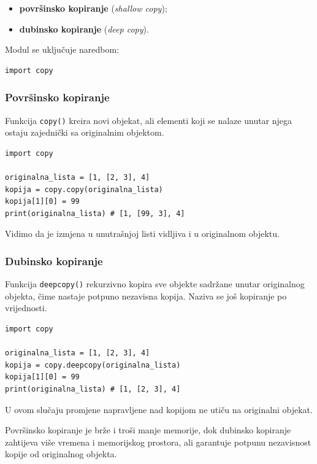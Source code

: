 \begin{itemize}
	\item \textbf{površinsko kopiranje} (\emph{shallow copy});
	\item \textbf{dubinsko kopiranje} (\emph{deep copy}).
\end{itemize}

Modul se uključuje naredbom:

\begin{verbatim}
import copy
\end{verbatim}

\subsubsection{Površinsko kopiranje}

Funkcija \texttt{copy()} kreira novi objekat, ali elementi koji se nalaze unutar njega ostaju zajednički sa originalnim objektom.

\begin{verbatim}
import copy

originalna_lista = [1, [2, 3], 4]
kopija = copy.copy(originalna_lista)
kopija[1][0] = 99
print(originalna_lista) # [1, [99, 3], 4]
\end{verbatim}

Vidimo da je izmjena u unutrašnjoj listi vidljiva i u originalnom objektu.

\subsubsection{Dubinsko kopiranje}

Funkcija \texttt{deepcopy()} rekurzivno kopira sve objekte sadržane unutar originalnog objekta, čime nastaje potpuno nezavisna kopija. Naziva se još kopiranje po vrijednosti. 

\begin{verbatim}
import copy

originalna_lista = [1, [2, 3], 4]
kopija = copy.deepcopy(originalna_lista)
kopija[1][0] = 99
print(originalna_lista) # [1, [2, 3], 4]
\end{verbatim}

U ovom slučaju promjene napravljene nad kopijom ne utiču na originalni objekat.

\bigskip

Površinsko kopiranje je brže i troši manje memorije, dok dubinsko kopiranje zahtijeva više vremena i memorijskog prostora, ali garantuje potpunu nezavisnost kopije od originalnog objekta.
  

